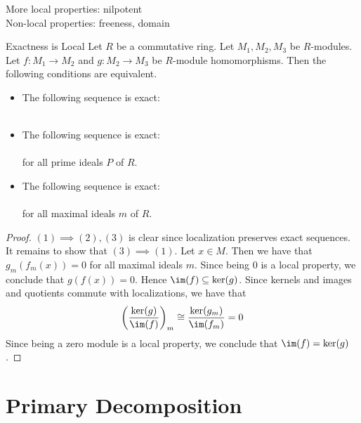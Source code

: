 \documentclass[a4paper]{article}
\begin{document}
More local properties: nilpotent\\
Non-local properties: freeness, domain

\begin{prp}{Exactness is Local}{} Let $R$ be a commutative ring. Let $M_1,M_2,M_3$ be $R$-modules. Let $f:M_1\to M_2$ and $g:M_2\to M_3$ be $R$-module homomorphisms. Then the following conditions are equivalent. 
\begin{itemize}
\item The following sequence is exact: \\
\\
\item The following sequence is exact: \\
\\
for all prime ideals $P$ of $R$. 
\item The following sequence is exact: \\
\\
for all maximal ideals $m$ of $R$. 
\end{itemize} 
\begin{proof}
$(1)\implies(2),(3)$ is clear since localization preserves exact sequences. It remains to show that $(3)\implies(1)$. Let $x\in M$. Then we have that $g_m(f_m(x))=0$ for all maximal ideals $m$. Since being $0$ is a local property, we conclude that $g(f(x))=0$. Hence $\im(f)\subseteq\ker(g)$. Since kernels and images and quotients commute with localizations, we have that $$\left(\frac{\ker(g)}{\im(f)}\right)_m\cong\frac{\ker(g_m)}{\im(f_m)}=0$$ Since being a zero module is a local property, we conclude that $\im(f)=\ker(g)$. 
\end{proof}
\end{prp}

\pagebreak
\section{Primary Decomposition}
\end{document}
